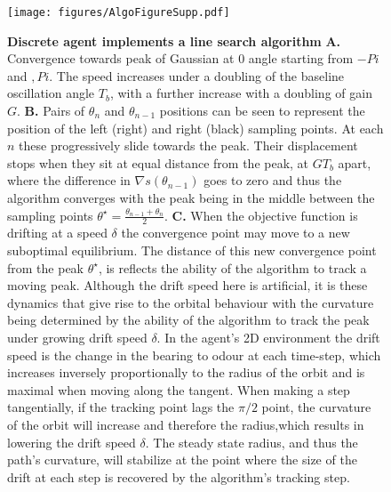 \documentclass[10pt,a4paper]{article}
\begin{document}
\begin{figure}[!ht]
\begin{center}
\texttt{[image: figures/AlgoFigureSupp.pdf]}
\caption{{\bf Discrete agent implements a line search algorithm} {\bf A.} Convergence towards peak of Gaussian at 0 angle starting from $-Pi$ and $,Pi$. The speed increases under a doubling of the baseline oscillation angle $T_b$, with a further increase with a doubling of gain $G$.    
{\bf B.} Pairs of $\theta_n$ and $\theta_{n-1}$ positions can be seen to represent the position of the left (right) and right (black) sampling points. At each $n$ these progressively slide towards the peak. Their displacement stops when they sit at equal distance from the peak, at $G T_b$ apart, where the difference in $\nabla s(\theta_{n-1})$ goes to zero and thus the algorithm converges with the peak being in the middle between the sampling points $\theta^{\star} =\frac{\theta_{n-1}+\theta_n}{2}$.
{\bf C.} When the objective function is drifting at a speed $\delta$ the convergence point may move to a new suboptimal equilibrium. The distance of this new convergence point from the peak $\theta^{\star}$, is reflects the ability of the algorithm to track a moving peak. Although the drift speed here is artificial, it is these dynamics that give rise to the orbital behaviour with the curvature being determined by the ability of the algorithm to track the peak under growing drift speed $\delta$. 
In the agent's 2D environment the drift speed is the change in the bearing to odour at each time-step, which increases inversely proportionally to the radius of the orbit and is maximal when moving along the tangent. When making a step tangentially, if the tracking point lags the $\pi/2$ point, the curvature of the orbit will increase and therefore the radius,which results in lowering the drift speed $\delta$.   
 The steady state radius, and thus the path's curvature, will stabilize at the point where the size of the drift at each step is recovered by the algorithm's tracking step. 
\label{fig:AlgoAnalysis}}
\end{center}
\end{figure}
\end{document}
